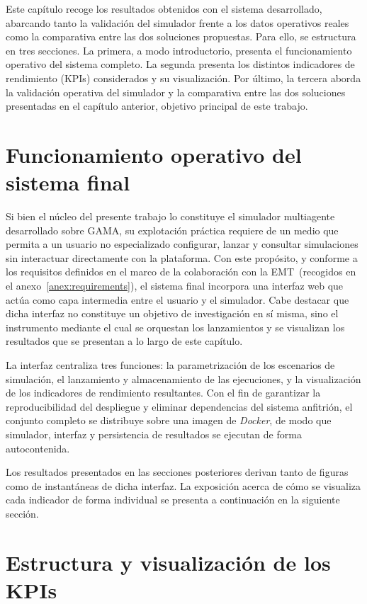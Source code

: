 Este capítulo recoge los resultados obtenidos con el sistema desarrollado, abarcando tanto la validación del simulador frente a los datos
operativos reales como la comparativa entre las dos soluciones propuestas. Para ello, se estructura en tres secciones.
La primera, a modo introductorio, presenta el funcionamiento operativo del sistema completo. La segunda presenta los distintos indicadores de
rendimiento (KPIs) considerados y su visualización. Por último, la tercera aborda la validación operativa del simulador y la comparativa
entre las dos soluciones presentadas en el capítulo anterior, objetivo principal de este trabajo.

\section{Funcionamiento operativo del sistema final}\label{sec:general_behaviour}
Si bien el núcleo del presente trabajo lo constituye el simulador multiagente desarrollado sobre GAMA, su explotación práctica requiere de un medio
que permita a un usuario no especializado configurar, lanzar y consultar simulaciones sin interactuar directamente con la plataforma.
Con este propósito, y conforme a los requisitos definidos en el marco de la colaboración con la EMT~(recogidos en el anexo~\ref{anex:requirements}),
el sistema final incorpora una interfaz web que actúa como capa intermedia entre el usuario y el simulador. Cabe destacar que dicha interfaz no 
constituye un objetivo de investigación en sí misma, sino el instrumento mediante el cual se orquestan los lanzamientos y se visualizan los 
resultados que se presentan a lo largo de este capítulo.

La interfaz centraliza tres funciones: la parametrización de los escenarios de simulación, el lanzamiento y almacenamiento de las ejecuciones,
y la visualización de los indicadores de rendimiento resultantes. Con el fin de garantizar la reproducibilidad del despliegue y eliminar
dependencias del sistema anfitrión, el conjunto completo se distribuye sobre una imagen de \textit{Docker}, de modo que simulador, interfaz y
persistencia de resultados se ejecutan de forma autocontenida.

Los resultados presentados en las secciones posteriores derivan tanto de figuras como de instantáneas de dicha interfaz. La exposición acerca
de cómo se visualiza cada indicador de forma individual se presenta a continuación en la siguiente sección.

\section{Estructura y visualización de los KPIs}\label{sec:kpi_visualization}

